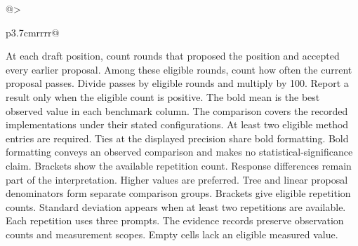 \documentclass[conference,onecolumn]{IEEEtran}
\begin{document}
\begin{table}[!htp]
\begin{tabular}{@{}>{\raggedright\arraybackslash}p{3.7cm}rrrr@{}}
\bottomrule
\end{tabular}\par\medskip
\begin{minipage}{\linewidth}\footnotesize
At each draft position, count rounds that proposed the position and accepted every earlier proposal. Among these eligible rounds, count how often the current proposal passes. Divide passes by eligible rounds and multiply by 100. Report a result only when the eligible count is positive.
The bold mean is the best observed value in each benchmark column. The comparison covers the recorded implementations under their stated configurations. At least two eligible method entries are required. Ties at the displayed precision share bold formatting. Bold formatting conveys an observed comparison and makes no statistical-significance claim. Brackets show the available repetition count. Response differences remain part of the interpretation. Higher values are preferred. Tree and linear proposal denominators form separate comparison groups.
Brackets give eligible repetition counts. Standard deviation appears when at least two repetitions are available. Each repetition uses three prompts. The evidence records preserve observation counts and measurement scopes. Empty cells lack an eligible measured value.
\end{minipage}
\end{table}
\end{document}
